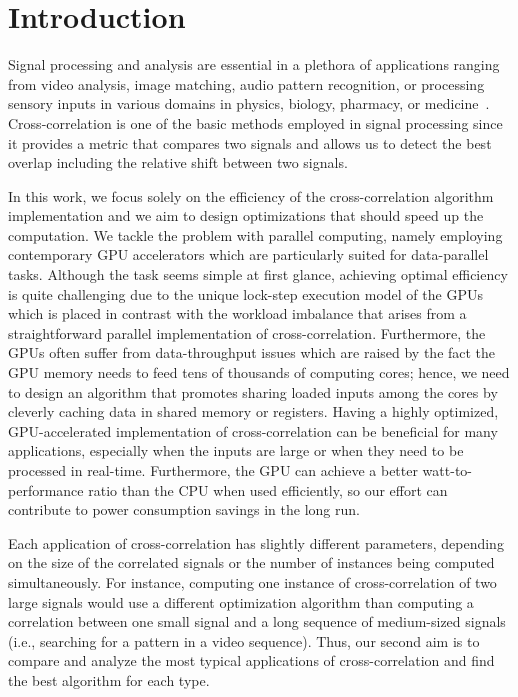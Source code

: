 \section{Introduction}

Signal processing and analysis are essential in a plethora of applications ranging from video analysis, image matching, audio pattern recognition, or processing sensory inputs in various domains in physics, biology, pharmacy, or medicine~\cite{Kapinchev2015}. Cross-correlation is one of the basic methods employed in signal processing since it provides a metric that compares two signals and allows us to detect the best overlap including the relative shift between two signals.

In this work, we focus solely on the efficiency of the cross-correlation algorithm implementation and we aim to design optimizations that should speed up the computation. We tackle the problem with parallel computing, namely employing contemporary GPU accelerators which are particularly suited for data-parallel tasks. Although the task seems simple at first glance, achieving optimal efficiency is quite challenging due to the unique lock-step execution model of the GPUs which is placed in contrast with the workload imbalance that arises from a straightforward parallel implementation of cross-correlation. Furthermore, the GPUs often suffer from data-throughput issues which are raised by the fact the GPU memory needs to feed tens of thousands of computing cores; hence, we need to design an algorithm that promotes sharing loaded inputs among the cores by cleverly caching data in shared memory or registers. Having a highly optimized, GPU-accelerated implementation of cross-correlation can be beneficial for many applications, especially when the inputs are large or when they need to be processed in real-time. Furthermore, the GPU can achieve a better watt-to-performance ratio than the CPU when used efficiently, so our effort can contribute to power consumption savings in the long run.

Each application of cross-correlation has slightly different parameters, depending on the size of the correlated signals or the number of instances being computed simultaneously. For instance, computing one instance of cross-correlation of two large signals would use a different optimization algorithm than computing a correlation between one small signal and a long sequence of medium-sized signals (i.e., searching for a pattern in a video sequence). Thus, our second aim is to compare and analyze the most typical applications of cross-correlation and find the best algorithm for each type.

